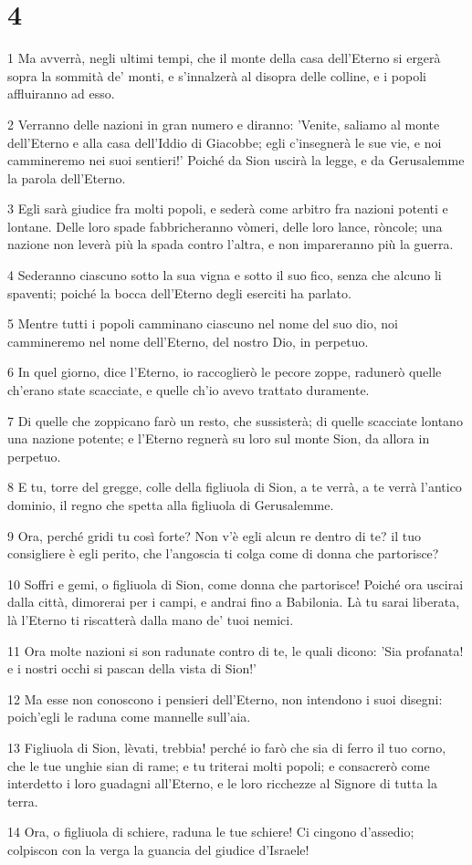 \chapter{4}

\par 1 Ma avverrà, negli ultimi tempi, che il monte della casa dell'Eterno si ergerà sopra la sommità de' monti, e s'innalzerà al disopra delle colline, e i popoli affluiranno ad esso.
\par 2 Verranno delle nazioni in gran numero e diranno: 'Venite, saliamo al monte dell'Eterno e alla casa dell'Iddio di Giacobbe; egli c'insegnerà le sue vie, e noi cammineremo nei suoi sentieri!' Poiché da Sion uscirà la legge, e da Gerusalemme la parola dell'Eterno.
\par 3 Egli sarà giudice fra molti popoli, e sederà come arbitro fra nazioni potenti e lontane. Delle loro spade fabbricheranno vòmeri, delle loro lance, ròncole; una nazione non leverà più la spada contro l'altra, e non impareranno più la guerra.
\par 4 Sederanno ciascuno sotto la sua vigna e sotto il suo fico, senza che alcuno li spaventi; poiché la bocca dell'Eterno degli eserciti ha parlato.
\par 5 Mentre tutti i popoli camminano ciascuno nel nome del suo dio, noi cammineremo nel nome dell'Eterno, del nostro Dio, in perpetuo.
\par 6 In quel giorno, dice l'Eterno, io raccoglierò le pecore zoppe, radunerò quelle ch'erano state scacciate, e quelle ch'io avevo trattato duramente.
\par 7 Di quelle che zoppicano farò un resto, che sussisterà; di quelle scacciate lontano una nazione potente; e l'Eterno regnerà su loro sul monte Sion, da allora in perpetuo.
\par 8 E tu, torre del gregge, colle della figliuola di Sion, a te verrà, a te verrà l'antico dominio, il regno che spetta alla figliuola di Gerusalemme.
\par 9 Ora, perché gridi tu così forte? Non v'è egli alcun re dentro di te? il tuo consigliere è egli perito, che l'angoscia ti colga come di donna che partorisce?
\par 10 Soffri e gemi, o figliuola di Sion, come donna che partorisce! Poiché ora uscirai dalla città, dimorerai per i campi, e andrai fino a Babilonia. Là tu sarai liberata, là l'Eterno ti riscatterà dalla mano de' tuoi nemici.
\par 11 Ora molte nazioni si son radunate contro di te, le quali dicono: 'Sia profanata! e i nostri occhi si pascan della vista di Sion!'
\par 12 Ma esse non conoscono i pensieri dell'Eterno, non intendono i suoi disegni: poich'egli le raduna come mannelle sull'aia.
\par 13 Figliuola di Sion, lèvati, trebbia! perché io farò che sia di ferro il tuo corno, che le tue unghie sian di rame; e tu triterai molti popoli; e consacrerò come interdetto i loro guadagni all'Eterno, e le loro ricchezze al Signore di tutta la terra.
\par 14 Ora, o figliuola di schiere, raduna le tue schiere! Ci cingono d'assedio; colpiscon con la verga la guancia del giudice d'Israele!

